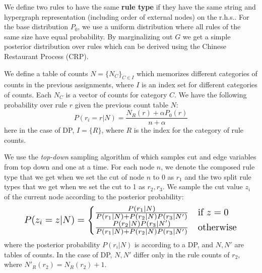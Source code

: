 We define two rules to have the same {\bf rule type} if they have the same string and hypergraph
representation (including order of external nodes) on the r.h.s..%
For the base distribution $P_0$, we use a uniform distribution where all rules of the same size have equal probability.
By marginalizing out $G$ we get a simple posterior distribution over rules which can be derived using the Chinese Restaurant Process (CRP). 


We define a 
table of counts $N=\{N_C\}_{C\in I}$ which memorizes different categories of counts in 
the previous assignments, where $I$
is an index set for different categories of counts. Each $N_C$ is a vector of counts for category $C$. 
We have the following probability over rule $r$ given the previous count table $N$:
\begin{equation}
P(r_i = r| N) = \frac{N_R(r) + \alpha P_0 (r)}{n + \alpha }
\end{equation}
here in the case of DP, $I=\{R\}$, where $R$ is the index for the category of rule counts.%

We use the {\em top-down} sampling algorithm of  which samples cut and edge variables from top down and one at a time.
For each node $n$, we denote the composed rule type
that we get when we set the cut of node $n$ to 0 as $r_1$ and the two 
split rule types that we get when we set the cut to 1 as $r_2, r_3$. We sample the cut value $z_i$ of the 
current node according to the posterior probability:
\begin{equation}
\label{eq:cut}
\resizebox{.88\hsize}{!}{$\displaystyle
P(z_i = z| N) = 
\begin{cases} 
\frac{ P (r_1| N) }{P (r_1|N) + P (r_2| N) P (r_3| N') } &\mbox{if } z = 0 \\ 
\frac{ P (r_2| N) P (r_3| N') }{P (r_1| N)+ P (r_2| N) P (r_3| N') } &\mbox{otherwise}
\end{cases}$}
\end{equation}
where the posterior probability $P(r_i|N)$ is according to a DP, 
and $N, N'$ are tables of 
counts. In the case of DP, $N, N'$ differ only in the rule counts of $r_2$, where $N'_R(r_2)= 
N_R(r_2)+1$.


